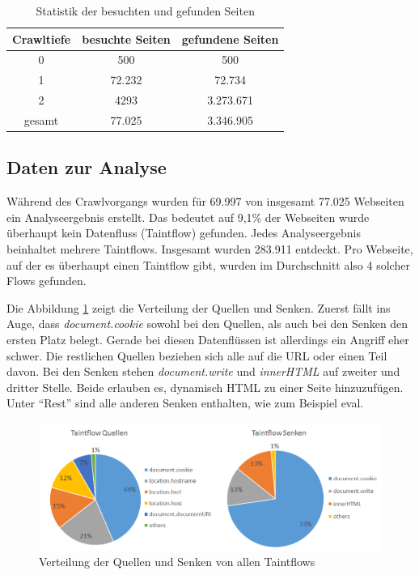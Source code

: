 \begin{table}
\centering
\begin{tabular}{|c|c|c|}
	\hline 
	Crawltiefe & besuchte Seiten & gefundene Seiten \\ 
	\hline 
	0 & 500 & 500 \\ 
	\hline 
	1 & 72.232 & 72.734 \\ 
	\hline 
	2 & 4293 & 3.273.671 \\ 
	\hline 
	\hline
	gesamt  & 77.025 & 3.346.905 \\ 
	\hline 
\end{tabular} 
\caption{Statistik der besuchten und gefunden Seiten}
\label{tab:StatistikBesuchteSeiten}
\end{table}

\subsection{Daten zur Analyse}
Während des Crawlvorgangs wurden für 69.997 von insgesamt 77.025 Webseiten ein Analyseergebnis erstellt. Das bedeutet auf 9,1\% der Webseiten wurde überhaupt kein Datenfluss (Taintflow) gefunden. Jedes Analyseergebnis beinhaltet mehrere Taintflows. Insgesamt wurden 283.911 entdeckt. Pro Webseite, auf der es überhaupt einen Taintflow gibt, wurden im Durchschnitt also 4 solcher Flows gefunden. 

Die Abbildung \ref{fig:VerteilungQuellenSenken}  zeigt die Verteilung der Quellen und Senken. Zuerst fällt ins Auge, dass \textit{document.cookie} sowohl bei den Quellen, als auch bei den Senken den ersten Platz belegt. Gerade bei diesen Datenflüssen ist allerdings ein Angriff eher schwer. Die restlichen Quellen beziehen sich alle auf die URL oder einen Teil davon. Bei den Senken stehen \textit{document.write} und \textit{innerHTML} auf zweiter und dritter Stelle. Beide erlauben es, dynamisch HTML zu einer Seite hinzuzufügen. Unter \enquote{Rest} sind alle anderen Senken enthalten, wie zum Beispiel eval. 

\begin{figure}[h]
	\centering
	\includegraphics[width=1\textwidth]{Bilder/Diagram1.png}
	\caption{Verteilung der Quellen und Senken von allen Taintflows}
	\label{fig:VerteilungQuellenSenken}
\end{figure}

